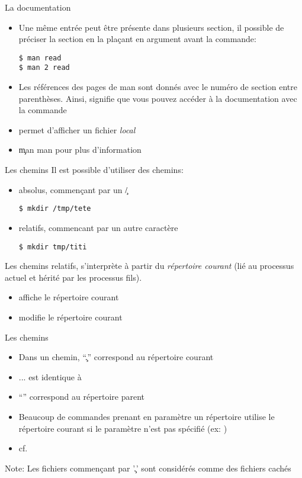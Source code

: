 \begin{frame}[fragile=singleslide]{La documentation}
  \begin{itemize}
  \item Une même entrée peut  être présente dans plusieurs section, il
    possible de préciser la section en la plaçant en argument avant la
    commande:
    \begin{lstlisting}
$ man read
$ man 2 read
    \end{lstlisting}
  \item Les références des pages de  man sont donnés avec le numéro de
    section entre parenthèses.  Ainsi,  signifie que vous
    pouvez   accéder    à   la   documentation    avec   la   commande
  \item {}  permet d'afficher un fichier \emph{local}
  \item \c{man man} pour plus d'information
  \end{itemize}
\end{frame}

\begin{frame}[fragile=singleslide]{Les chemins}
  Il est possible d'utiliser des chemins:
  \begin{itemize}
  \item absolus, commençant par un \c{/}
    \begin{lstlisting}
$ mkdir /tmp/tete
    \end{lstlisting}
  \item relatifs, commencant par un autre caractère
    \begin{lstlisting}
$ mkdir tmp/titi
    \end{lstlisting}
  \end{itemize}
  Les  chemins  relatifs, s'interprète  à  partir du  \emph{répertoire
    courant}  (lié au  processus actuel  et hérité  par  les processus
  fils).
  \begin{itemize}
  \item {} affiche le répertoire courant
  \item {} modifie le répertoire courant
  \end{itemize}
\end{frame}

\begin{frame}[fragile=singleslide]{Les chemins}
  \begin{itemize}
  \item Dans un chemin, ``\c{.}'' correspond au répertoire courant
  \item ...  est identique à 
  \item ``'' correspond au répertoire parent
  \item  Beaucoup de  commandes  prenant en  paramètre un  répertoire
    utilise le  répertoire courant si le paramètre  n'est pas spécifié
    (ex: )
  \item  cf. 
  \end{itemize}
  Note: Les fichiers commençant  par '\c{.}' sont considérés comme des
  fichiers cachés
\end{frame}

